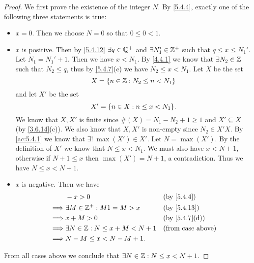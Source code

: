 \begin{proof}
  We first prove the existence of the integer \(N\).
  By \cref{5.4.4}, exactly one of the following three statements is true:
  \begin{itemize}
    \item \(x = 0\).
          Then we choose \(N = 0\) so that \(0 \leq 0 < 1\).
    \item \(x\) is positive.
          Then by \cref{5.4.12} \(\exists q \in \mathbb{Q}^+\) and \(\exists N_1' \in \mathbb{Z}^+\) such that \(q \leq x \leq N_1'\).
          Let \(N_1 = N_1' + 1\).
          Then we have \(x < N_1\).
          By \cref{4.4.1} we know that \(\exists N_2 \in \mathbb{Z}\) such that \(N_2 \leq q\), thus by \cref{5.4.7}(c) we have \(N_2 \leq x < N_1\).
          Let \(X\) be the set
          \[
            X = \left\lbrace n \in \mathbb{Z} : N_2 \leq n < N_1\right\rbrace
          \]
          and let \(X'\) be the set
          \[
            X' = \set{n \in X : n \leq x < N_1}.
          \]
          We know that \(X, X'\) is finite since \(\#(X) = N_1 - N_2 + 1 \geq 1\) and \(X' \subseteq X\) (by \cref{3.6.14}(c)).
          We also know that \(X, X'\) is non-empty since \(N_2 \in X'X\).
          By \cref{ac:5.4.1} we know that \(\exists!\ \max(X') \in X'\).
          Let \(N = \max(X')\).
          By the definition of \(X'\) we know that \(N \leq x < N_1\).
          We must also have \(x < N + 1\), otherwise if \(N + 1 \leq x\) then \(\max(X') = N + 1\), a contradiction.
          Thus we have \(N \leq x < N + 1\).
    \item \(x\) is negative.
          Then we have
          \begin{align*}
                     & -x > 0                                  &  & \by{5.4.4}               \\
            \implies & \exists M \in \Z^+ : M1 = M > x         &  & \by{5.4.13}              \\
            \implies & x + M > 0                               &  & \by{5.4.7}[d]            \\
            \implies & \exists N \in \Z : N \leq x + M < N + 1 &  & \text{(from case above)} \\
            \implies & N - M \leq x < N - M + 1.
          \end{align*}
  \end{itemize}
  From all cases above we conclude that \(\exists N \in \mathbb{Z} : N \leq x < N + 1\).


\end{proof}

